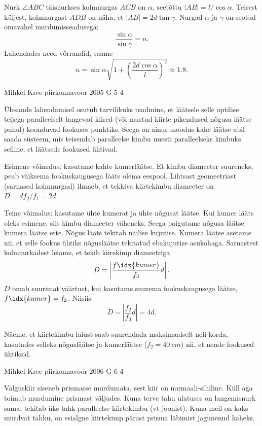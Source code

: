 \documentclass[11pt]{article}
\begin{document}
{{Nurk $\angle ABC$ täisnurkses kolmnurgas $ACB$ on $\alpha$, seetõttu $|AB| = l/ \cos \alpha$. Teisest küljest, kolmnurgast $ADB$ on näha, et $|AB| = 2d \tan \gamma$. Nurgad $\alpha$ ja $\gamma$ on seotud omavahel murdumisseadusega:
\[
\frac{\sin\alpha}{\sin\gamma} = n.
\]
Lahendades need võrrandid, saame
\[
n=\sin \alpha \sqrt{1+\left(\frac{2 d \cos \alpha}{l}\right)^{2}} \approx \num{1,8}.
\]
\fi
}

{Mihkel Kree} %
{piirkonnavoor} %
{2005} %
{G 5} %
{4} %
{

\ifSolution
Ülesande lahendamisel osutub tarvilikuks teadmine, et läätsele selle optilise teljega paralleelselt langevad kiired (või murtud kiirte pikendused nõgusa läätse puhul) koonduvad fookuses punktiks. Seega on ainus moodus kahe läätse abil saada süsteem, mis teisendab paralleelse kimbu uuesti paralleelseks kimbuks selline, et läätsede fookused ühtivad. 

Esimene võimalus: kasutame kahte kumerläätse. Et kimbu diameeter suureneks, peab väiksema fookuskaugusega lääts olema eespool. Lihtsast geomeetriast (sarnased kolmnurgad) ilmneb, et tekkiva kiirtekimbu diameeter on $D = df_2/f_1 = 2d$.

Teine võimalus: kasutame ühte kumerat ja ühte nõgusat läätse. Kui kumer lääts oleks esimene, siis kimbu diameeter väheneks. Seega paigutame nõgusa läätse kumera läätse ette. Nõgus lääts tekitab näilise kujutise. Kumera läätse asetame nii, et selle fookus ühtiks nõgusläätse tekitatud ebakujutise asukohaga. Sarnastest kolmnurkadest leiame, et tekib kiirekimp diameetriga
\[
D = \left|\frac{f\idx{kumer}}{f_3}d\right|.
\]
$D$ omab suurimat väärtust, kui kasutame suurema fookuskaugusega läätse, $f\idx{kumer} = f_2$. Niisiis
\[
D = \left|\frac{f_2}{f_3}d\right| = 4d.
\]


Näeme, et kiirtekimbu laiust saab suurendada maksimaalselt neli korda, kasutades selleks nõgusläätse ja kumerläätse ($f_2 = \SI{40}{cm}$) nii, et nende fookused ühtiksid.
\fi
}

{Mihkel Kree} %
{piirkonnavoor} %
{2006} %
{G 6} %
{4} %
{

\ifSolution
Valguskiir siseneb prismasse murdumata, sest kiir on normaali-sihiline. Küll aga toimub murdumine prismast väljudes. Kuna terve tahu ulatuses on langemisnurk sama, tekitab üks tahk paralleelse kiirtekimbu (vt joonist). Kuna meil on kaks murdvat tahku, on esialgne kiirtekimp pärast prisma läbimist jagunenud kaheks.

}}
\end{document}
